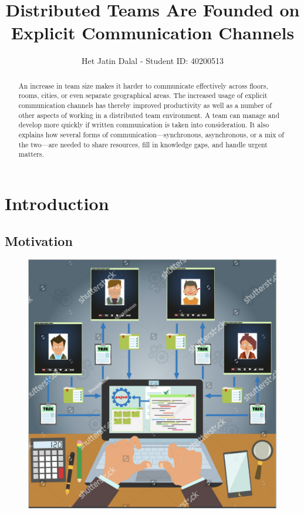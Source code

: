 \documentclass{llncs}
\begin{document}
%
\title{Distributed Teams Are Founded on Explicit
Communication Channels}
%
%
\author{Het Jatin Dalal - Student ID: 40200513}
%

%

{\def\addcontentsline#1#2#3{}\maketitle}


\begin{abstract}
An increase in team size makes it harder to communicate effectively across floors, rooms, cities, or even separate geographical areas. The increased usage of explicit communication channels has thereby improved productivity as well as a number of other aspects of working in a distributed team environment. A team can manage and develop more quickly if written communication is taken into consideration. It also explains how several forms of communication—synchronous, asynchronous, or a mix of the two—are needed to share resources, fill in knowledge gaps, and handle urgent matters. 

\end{abstract}
%
%
%
\tableofcontents
\newpage



\section{Introduction}
\subsection{Motivation}

\begin{figure}   
    \includegraphics[width=0.2\linewidth]{DTlogo.png}
\end{figure}
\end{document}
